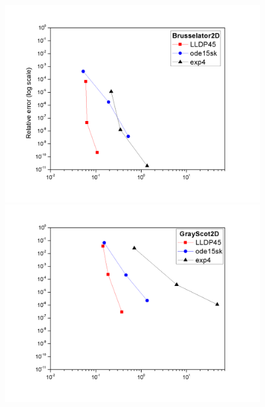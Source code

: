 \documentclass{article}
\begin{document}
\begin{figure}
\begin{minipage}{.49\textwidth}
\end{minipage}
\begin{minipage}{.5\textwidth}
	\vspace{-0.4in}
	\hspace{-0.8in}\includegraphics[scale=0.4]{Brusselator2D.png}
\end{minipage}
\begin{minipage}{.49\textwidth}
	\vspace{-0.4in}
	\includegraphics[scale=0.4]{GrayScot2D.png}
\end{minipage}
\begin{minipage}{.5\textwidth}
	\vspace{-0.4in}

\end{minipage}
\end{figure}
\end{document}
